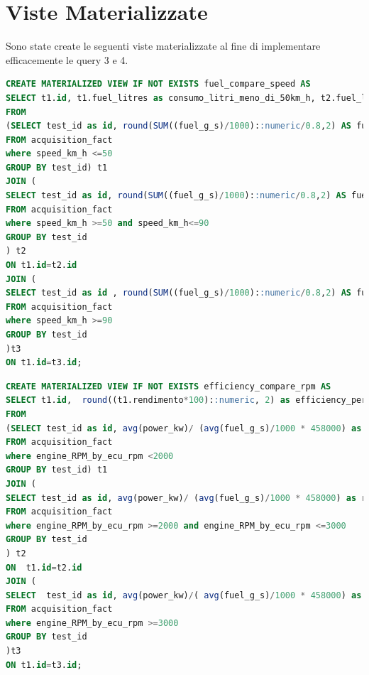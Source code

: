 \section{Viste Materializzate}
Sono state create le seguenti viste materializzate al fine di implementare efficacemente le query 3 e 4.
\\
\begin{lstlisting}[language=SQL]
CREATE MATERIALIZED VIEW IF NOT EXISTS fuel_compare_speed AS
SELECT t1.id, t1.fuel_litres as consumo_litri_meno_di_50km_h, t2.fuel_litres as consumo_litri_meno_di_90km_h, t3.fuel_litres as consumo_litri_meno_di_130km_h
FROM
(SELECT test_id as id, round(SUM((fuel_g_s)/1000)::numeric/0.8,2) AS fuel_litres, round(AVG(velocity_km_h)::numeric,1) as average_speed_km_h
FROM acquisition_fact
where speed_km_h <=50
GROUP BY test_id) t1
JOIN (
SELECT test_id as id, round(SUM((fuel_g_s)/1000)::numeric/0.8,2) AS fuel_litres, round(AVG(velocity_km_h)::numeric,1) as average_speed_km_h
FROM acquisition_fact
where speed_km_h >=50 and speed_km_h<=90
GROUP BY test_id
) t2
ON t1.id=t2.id
JOIN (
SELECT test_id as id , round(SUM((fuel_g_s)/1000)::numeric/0.8,2) AS fuel_litres, round(AVG(velocity_km_h)::numeric,1) as average_speed_km_h
FROM acquisition_fact
where speed_km_h >=90
GROUP BY test_id
)t3
ON t1.id=t3.id;
\end{lstlisting}
	
\begin{lstlisting}[language=SQL]
CREATE MATERIALIZED VIEW IF NOT EXISTS efficiency_compare_rpm AS
SELECT t1.id,  round((t1.rendimento*100)::numeric, 2) as efficiency_perc_max2000rpm, round((t2.rendimento*100)::numeric,2) as efficiency_perc_max3000rpm, round((t3.rendimento*100)::numeric,2) as efficiency_perc_over3000rpm
FROM
(SELECT test_id as id, avg(power_kw)/ (avg(fuel_g_s)/1000 * 458000) as rendimento
FROM acquisition_fact
where engine_RPM_by_ecu_rpm <2000
GROUP BY test_id) t1
JOIN (
SELECT test_id as id, avg(power_kw)/ (avg(fuel_g_s)/1000 * 458000) as rendimento
FROM acquisition_fact
where engine_RPM_by_ecu_rpm >=2000 and engine_RPM_by_ecu_rpm <=3000
GROUP BY test_id
) t2
ON  t1.id=t2.id
JOIN (
SELECT  test_id as id, avg(power_kw)/( avg(fuel_g_s)/1000 * 458000) as rendimento
FROM acquisition_fact
where engine_RPM_by_ecu_rpm >=3000
GROUP BY test_id
)t3
ON t1.id=t3.id;
\end{lstlisting}
